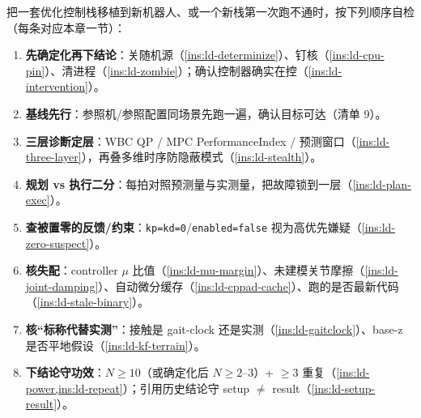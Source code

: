 \begin{practice}
把一套优化控制栈移植到新机器人、或一个新栈第一次跑不通时，按下列顺序自检（每条对应本章一节）：
\begin{enumerate}
  \item \textbf{先确定化再下结论}：关随机源（\cref{ins:ld-determinize}）、钉核（\cref{ins:ld-cpu-pin}）、清进程（\cref{ins:ld-zombie}）；确认控制器确实在控（\cref{ins:ld-intervention}）。
  \item \textbf{基线先行}：参照机/参照配置同场景先跑一遍，确认目标可达（清单 9）。
  \item \textbf{三层诊断定层}：WBC QP / MPC PerformanceIndex / 预测窗口（\cref{ins:ld-three-layer}），再叠多维时序防隐蔽模式（\cref{ins:ld-stealth}）。
  \item \textbf{规划 vs 执行二分}：每拍对照预测量与实测量，把故障锁到一层（\cref{ins:ld-plan-exec}）。
  \item \textbf{查被置零的反馈/约束}：\texttt{kp=kd=0}/\texttt{enabled=false} 视为高优先嫌疑（\cref{ins:ld-zero-suspect}）。
  \item \textbf{核失配}：controller $\mu$ 比值（\cref{ins:ld-mu-margin}）、未建模关节摩擦（\cref{ins:ld-joint-damping}）、自动微分缓存（\cref{ins:ld-cppad-cache}）、跑的是否最新代码（\cref{ins:ld-stale-binary}）。
  \item \textbf{核“标称代替实测”}：接触是 gait-clock 还是实测（\cref{ins:ld-gaitclock}）、base-z 是否平地假设（\cref{ins:ld-kf-terrain}）。
  \item \textbf{下结论守功效}：$N\ge 10$（或确定化后 $N\ge 2$--$3$）+ $\ge 3$ 重复（\cref{ins:ld-power,ins:ld-repeat}）；引用历史结论守 setup $\ne$ result（\cref{ins:ld-setup-result}）。
\end{enumerate}
\end{practice}

